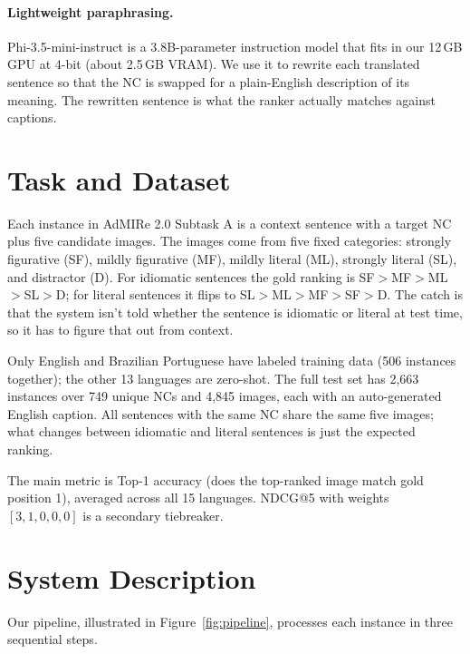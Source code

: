 \documentclass[11pt]{article}
\begin{document}
\paragraph{Lightweight paraphrasing.}
Phi-3.5-mini-instruct \cite{phi3_2024} is a 3.8B-parameter instruction model
that fits in our 12\,GB GPU at 4-bit (about 2.5\,GB VRAM). We use it to
rewrite each translated sentence so that the NC is swapped for a plain-English
description of its meaning. The rewritten sentence is what the ranker actually
matches against captions.

\section{Task and Dataset}

Each instance in AdMIRe 2.0 Subtask A is a context sentence with a target NC
plus five candidate images. The images come from five fixed categories:
strongly figurative (SF), mildly figurative (MF), mildly literal (ML),
strongly literal (SL), and distractor (D). For idiomatic sentences the gold
ranking is SF$>$MF$>$ML$>$SL$>$D; for literal sentences it flips to
SL$>$ML$>$MF$>$SF$>$D. The catch is that the system isn't told whether the
sentence is idiomatic or literal at test time, so it has to figure that out
from context.

Only English and Brazilian Portuguese have labeled training data (506
instances together); the other 13 languages are zero-shot. The full test set
has 2{,}663 instances over 749 unique NCs and 4{,}845 images, each with an
auto-generated English caption. All sentences with the same NC share the same
five images; what changes between idiomatic and literal sentences is just the
expected ranking.

The main metric is Top-1 accuracy (does the top-ranked image match gold
position 1), averaged across all 15 languages. NDCG@5 with weights
$[3,1,0,0,0]$ is a secondary tiebreaker.

\section{System Description}

Our pipeline, illustrated in Figure~\ref{fig:pipeline}, processes each instance
in three sequential steps.
\end{document}
